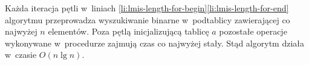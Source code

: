 Każda iteracja pętli  w~liniach \ref{li:lmis-length-for-begin}\nbendash\ref{li:lmis-length-for-end} algorytmu  przeprowadza wyszukiwanie binarne w~podtablicy zawierającej co najwyżej $n$ elementów.
Poza pętlą inicjalizującą tablicę $a$ pozostałe operacje wykonywane w~procedurze zajmują czas co najwyżej stały.
Stąd algorytm działa w~czasie $O(n\lg n)$.
